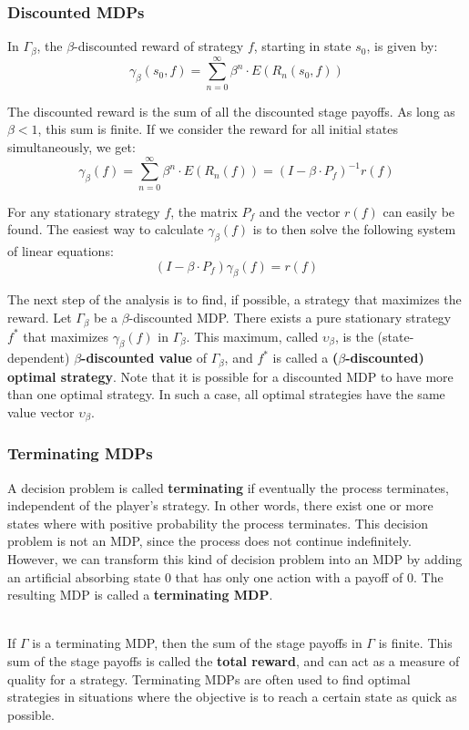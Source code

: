 \documentclass[12pt]{article}
\begin{document}
\subsubsection{Discounted MDPs}
In $\Gamma_\beta$, the $\beta$-discounted reward of strategy $f$, starting in state $s_0$, is given by:
\[ \gamma_\beta(s_0, f) = \sum_{n = 0}^\infty \beta^n \cdot E(R_n(s_0, f)) \]

\noindent
The discounted reward is the sum of all the discounted stage payoffs.
As long as $\beta < 1$, this sum is finite.
If we consider the reward for all initial states simultaneously, we get:
\[ \gamma_\beta(f) = \sum_{n = 0}^\infty \beta^n \cdot E(R_n(f)) = (I - \beta \cdot P_f)^{-1} r(f) \]

\noindent
For any stationary strategy $f$, the matrix $P_f$ and the vector $r(f)$ can easily be found.
The easiest way to calculate $\gamma_\beta(f)$ is to then solve the following system of linear equations:
\[ (I - \beta \cdot P_f) \gamma_\beta(f) = r(f) \]

\newpage
\noindent
The next step of the analysis is to find, if possible, a strategy that maximizes the reward.
Let $\Gamma_\beta$ be a $\beta$-discounted MDP.
There exists a pure stationary strategy $f^*$ that maximizes $\gamma_\beta(f)$ in $\Gamma_\beta$.
This maximum, called $\upsilon_\beta$, is the (state-dependent) \textbf{$\beta$-discounted value} of $\Gamma_\beta$, and $f^*$ is called a \textbf{($\beta$-discounted) optimal strategy}.
Note that it is possible for a discounted MDP to have more than one optimal strategy.
In such a case, all optimal strategies have the same value vector $\upsilon_\beta$.

\subsubsection{Terminating MDPs}
A decision problem is called \textbf{terminating} if eventually the process terminates, independent of the player's strategy.
In other words, there exist one or more states where with positive probability the process terminates.
This decision problem is not an MDP, since the process does not continue indefinitely.
However, we can transform this kind of decision problem into an MDP by adding an artificial absorbing state $0$ that has only one action with a payoff of $0$.
The resulting MDP is called a \textbf{terminating MDP}.

\noindent
\\
If $\Gamma$ is a terminating MDP, then the sum of the stage payoffs in $\Gamma$ is finite.
This sum of the stage payoffs is called the \textbf{total reward}, and can act as a measure of quality for a strategy.
Terminating MDPs are often used to find optimal strategies in situations where the objective is to reach a certain state as quick as possible.
\end{document}
